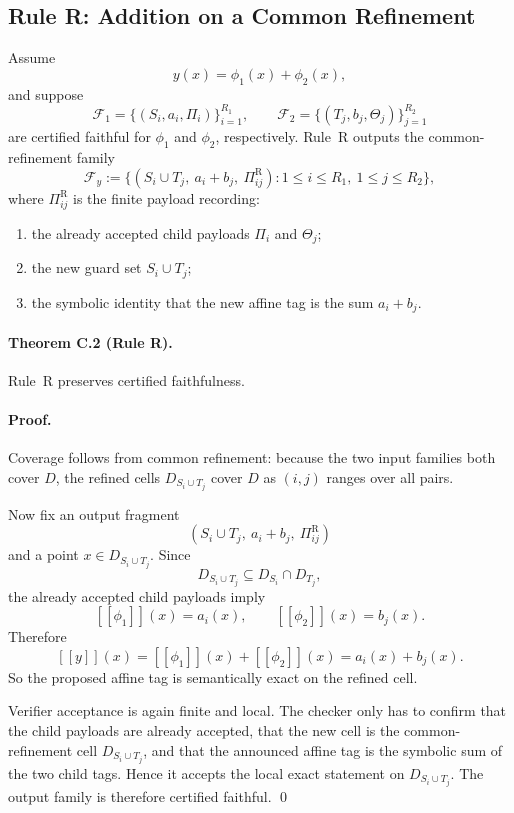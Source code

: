 \subsection{Rule R: Addition on a Common Refinement}

Assume
\[
 y(x)=\phi_1(x)+\phi_2(x),
\]
and suppose
\[
 \mathcal F_1=\{(S_i,a_i,\Pi_i)\}_{i=1}^{R_1},
 \qquad
 \mathcal F_2=\{(T_j,b_j,\Theta_j)\}_{j=1}^{R_2}
\]
are certified faithful for $\phi_1$ and $\phi_2$, respectively. Rule~R outputs the common-refinement family
\[
 \mathcal F_y:=\bigl\{(S_i\cup T_j,\ a_i+b_j,\ \Pi_{ij}^{\mathrm R}) : 1\le i\le R_1,\ 1\le j\le R_2\bigr\},
\]
where $\Pi_{ij}^{\mathrm R}$ is the finite payload recording:
\begin{enumerate}
    \item the already accepted child payloads $\Pi_i$ and $\Theta_j$;
    \item the new guard set $S_i\cup T_j$;
    \item the symbolic identity that the new affine tag is the sum $a_i+b_j$.
\end{enumerate}

\paragraph{Theorem C.2 (Rule R).}
Rule~R preserves certified faithfulness.

\paragraph{Proof.}
Coverage follows from common refinement: because the two input families both cover $D$, the refined cells $D_{S_i\cup T_j}$ cover $D$ as $(i,j)$ ranges over all pairs.

Now fix an output fragment
\[
 (S_i\cup T_j,\ a_i+b_j,\ \Pi_{ij}^{\mathrm R})
\]
and a point $x\in D_{S_i\cup T_j}$. Since
\[
 D_{S_i\cup T_j}\subseteq D_{S_i}\cap D_{T_j},
\]
the already accepted child payloads imply
\[
 [[\phi_1]](x)=a_i(x),
 \qquad
 [[\phi_2]](x)=b_j(x).
\]
Therefore
\[
 [[y]](x)= [[\phi_1]](x)+[[\phi_2]](x)=a_i(x)+b_j(x).
\]
So the proposed affine tag is semantically exact on the refined cell.

Verifier acceptance is again finite and local. The checker only has to confirm that the child payloads are already accepted, that the new cell is the common-refinement cell $D_{S_i\cup T_j}$, and that the announced affine tag is the symbolic sum of the two child tags. Hence it accepts the local exact statement on $D_{S_i\cup T_j}$. The output family is therefore certified faithful. \qed

